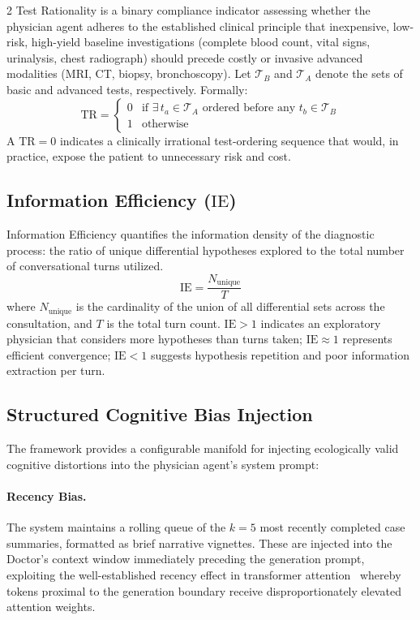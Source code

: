 \documentclass[10pt, a4paper]{article}
\newcommand{\TR}{\mathrm{TR}}
\newcommand{\IE}{\mathrm{IE}}
\begin{document}
\begin{multicols}{2}
Test Rationality is a binary compliance indicator assessing whether the physician agent adheres to the established clinical principle that inexpensive, low-risk, high-yield baseline investigations (complete blood count, vital signs, urinalysis, chest radiograph) should precede costly or invasive advanced modalities (MRI, CT, biopsy, bronchoscopy). Let $\mathcal{T}_B$ and $\mathcal{T}_A$ denote the sets of basic and advanced tests, respectively. Formally:
\begin{equation}
    \TR = \begin{cases}
        0 & \text{if } \exists\, t_a \in \mathcal{T}_A \text{ ordered before any } t_b \in \mathcal{T}_B \\
        1 & \text{otherwise}
    \end{cases}
\end{equation}
A $\TR = 0$ indicates a clinically irrational test-ordering sequence that would, in practice, expose the patient to unnecessary risk and cost.

\subsection{Information Efficiency ($\IE$)}

Information Efficiency quantifies the information density of the diagnostic process: the ratio of unique differential hypotheses explored to the total number of conversational turns utilized.
\begin{equation}
    \IE = \frac{N_{\text{unique}}}{T}
\end{equation}
where $N_{\text{unique}}$ is the cardinality of the union of all differential sets across the consultation, and $T$ is the total turn count. $\IE > 1$ indicates an exploratory physician that considers more hypotheses than turns taken; $\IE \approx 1$ represents efficient convergence; $\IE < 1$ suggests hypothesis repetition and poor information extraction per turn.

\subsection{Structured Cognitive Bias Injection}

The framework provides a configurable manifold for injecting ecologically valid cognitive distortions into the physician agent's system prompt:

\paragraph{Recency Bias.} The system maintains a rolling queue of the $k = 5$ most recently completed case summaries, formatted as brief narrative vignettes. These are injected into the Doctor's context window immediately preceding the generation prompt, exploiting the well-established recency effect in transformer attention~\cite{liu2024lost} whereby tokens proximal to the generation boundary receive disproportionately elevated attention weights.


\end{multicols}
\end{document}
